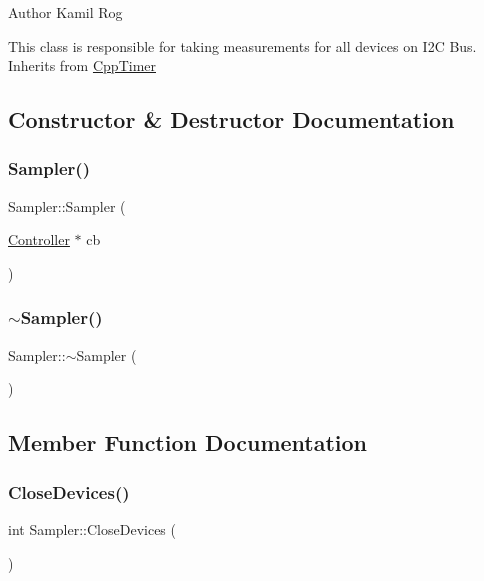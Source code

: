 \begin{DoxyAuthor}{Author}
Kamil Rog
\end{DoxyAuthor}
This class is responsible for taking measurements for all devices on I2C Bus. Inherits from \hyperlink{classCppTimer}{Cpp\+Timer} 

\subsection{Constructor \& Destructor Documentation}
\mbox{\label{classSampler_aec4905ed5f8259bb5e361da172bf7f17}} 
\subsubsection{\texorpdfstring{Sampler()}{Sampler()}}
{\footnotesize\ttfamily Sampler\+::\+Sampler (\begin{DoxyParamCaption}\item[{\hyperlink{classController}{Controller} $\ast$}]{cb }\end{DoxyParamCaption})\hspace{0.3cm}{\ttfamily [inline]}}

\mbox{\label{classSampler_afbbbd238b78dd3024686c852b69fa64e}} 
\subsubsection{\texorpdfstring{$\sim$\+Sampler()}{~Sampler()}}
{\footnotesize\ttfamily Sampler\+::$\sim$\+Sampler (\begin{DoxyParamCaption}{ }\end{DoxyParamCaption})\hspace{0.3cm}{\ttfamily [inline]}}



\subsection{Member Function Documentation}
\mbox{\label{classSampler_a24077f1eeb2491b65f9577efd07dffd6}} 
\subsubsection{\texorpdfstring{Close\+Devices()}{CloseDevices()}}
{\footnotesize\ttfamily int Sampler\+::\+Close\+Devices (\begin{DoxyParamCaption}{ }\end{DoxyParamCaption})\hspace{0.3cm}{\ttfamily [private]}}

